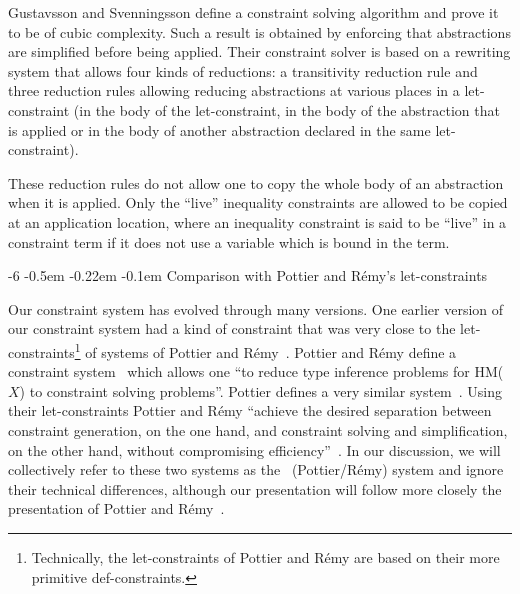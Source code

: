 \documentclass{jfp1}
\makeatletter
\def\subsubsection{\@startsection{subsubsection}{3}{\z@}{-0.2\baselineskip plus -0.1\baselineskip minus -0.1\baselineskip}%
    {-0.5em \@plus -0.22em \@minus -0.1em}{\normalfont\normalsize\bfseries}}%
\newcommand{\sectiontitledot}[1]{#1.}
\renewcommand\subsubsection{\@startsection{subsubsection}{3}{\z@}%
                            {-6\p@ \@plus -1\p@ \@minus -1\p@}%
                            {-0.5em \@plus -0.22em \@minus -0.1em}%
                            {\normalfont\normalsize\bfseries\boldmath\sectiontitledot}}
\makeatother
\begin{document}
Gustavsson and Svenningsson define a constraint solving algorithm and
prove it to be of cubic complexity.  Such a result is obtained by
enforcing that abstractions are simplified before being applied.
Their constraint solver is based on a rewriting system that allows
four kinds of reductions: a transitivity reduction rule and three
reduction rules allowing reducing abstractions at various places in a
let-constraint (in the body of the let-constraint, in the body of the
abstraction that is applied or in the body of another abstraction
declared in the same let-constraint).

These reduction rules do not allow one to copy the whole body of an
abstraction when it is applied.  Only the ``live'' inequality
constraints are allowed to be copied at an application location, where
an inequality constraint is said to be ``live'' in a constraint term
if it does not use a variable which is bound in the term.
%




\subsubsection{Comparison with Pottier and R\'emy's let-constraints} %
\label{sec:comparisonpottierremy}


Our constraint system has evolved through many versions.
One earlier version of our constraint system had a kind of constraint
that was very close to the let-constraints\footnote{Technically, the
  let-constraints of Pottier and R\'emy are based on their more
  primitive def-constraints.} of systems of Pottier and
R\'emy~\cite{Pottier+Remy:2005,Pottier:2005}.
%
Pottier and R\'emy define a constraint system~\cite{Pottier+Remy:2005}
which allows one ``to reduce type inference problems for HM($X$) to
constraint solving problems''.  Pottier defines a very similar
system~\cite{Pottier:2005}.  Using their let-constraints Pottier and
R\'emy ``achieve the desired separation between constraint generation,
on the one hand, and constraint solving and simplification, on the
other hand, without compromising
efficiency''~\cite{Pottier+Remy:2005}.
%
%
In our discussion, we will collectively refer to these two systems as
the \PR\ (Pottier/R\'emy) system and ignore their technical differences,
although our presentation will follow more closely the presentation of
Pottier and R\'emy~\cite{Pottier+Remy:2005}.
\end{document}

